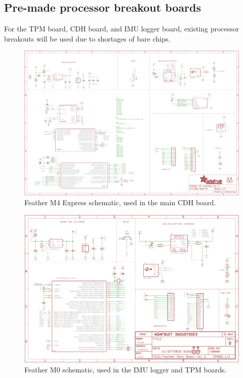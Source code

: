\documentclass{article}
\begin{document}
\subsection{Pre-made processor breakout boards}
For the TPM board, CDH board, and IMU logger board, existing processor breakouts will be used due to shortages of bare chips.
\begin{figure}[H]
	\centering
	\includegraphics[width=\textwidth]{images/adafruit_featherm4_schematic}
	\caption{Feather M4 Express schematic, used in the main CDH board.}
	\label{fig:schematic-featherm4}
\end{figure}
\begin{figure}[H]
	\centering
	\includegraphics[width=\textwidth]{images/adafruit_featherm0_schematic}
	\caption{Feather M0 schematic, used in the IMU logger and TPM boards.}
	\label{fig:schematic-featherm0}
\end{figure}
\end{document}
